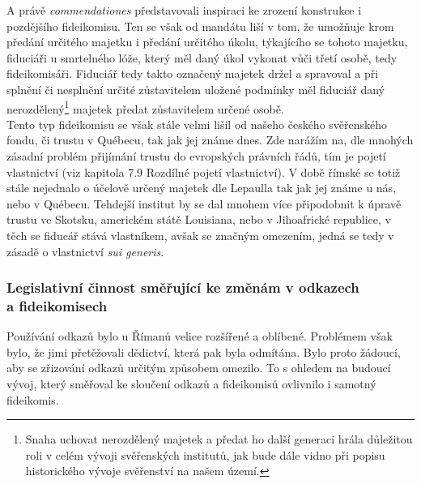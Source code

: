 \documentclass{article}
\begin{document}
A právě \textit{commendationes} představovali inspiraci ke zrození konstrukce i pozdějšího fideikomisu. Ten se však od mandátu liší v tom, že umožňuje krom předání určitého majetku i předání určitého úkolu, týkajícího se tohoto majetku, fiduciáři u smrtelného lóže, který měl daný úkol vykonat vůči třetí osobě, tedy fideikomisáři. Fiduciář tedy takto označený majetek držel a spravoval a při splnění či nesplnění určité zůstavitelem uložené podmínky měl fiduciář daný nerozdělený\footnote{Snaha uchovat nerozdělený majetek a předat ho další generaci hrála důležitou roli v celém vývoji svěřenských institutů, jak bude dále vidno při popisu historického vývoje svěřenství na našem území.} majetek předat zůstavitelem určené osobě.\\

Tento typ fideikomisu se však stále velmi lišil od našeho českého svěřenského fondu, či trustu v Québecu, tak jak jej známe dnes. Zde narážím na, dle mnohých zásadní problém přijímání trustu do evropských právních řádů, tím je pojetí vlastnictví (viz kapitola 7.9 Rozdílné pojetí vlastnictví). V době římské se totiž stále nejednalo o účelově určený majetek dle Lepaulla tak jak jej známe u nás, nebo v Québecu. Tehdejší institut by se dal mnohem více připodobnit k úpravě trustu ve Skotsku, americkém státě Louisiana, nebo v Jihoafrické republice, v těch se fiducář stává vlastníkem, avšak se značným omezením, jedná se tedy v zásadě o vlastnictví \textit{sui generis}.\\


\subsubsection{Legislativní činnost směřující ke změnám v odkazech\\ a fideikomisech}

Používání odkazů bylo u Římanů velice rozšířené a oblíbené. Problémem však bylo, že jimi přetěžovali dědictví, která pak byla odmítána. Bylo proto žádoucí, aby se zřizování odkazů určitým způsobem omezilo. To s ohledem na budoucí vývoj, který směřoval ke sloučení odkazů a fideikomisů ovlivnilo i samotný fideikomis.\\
\end{document}
